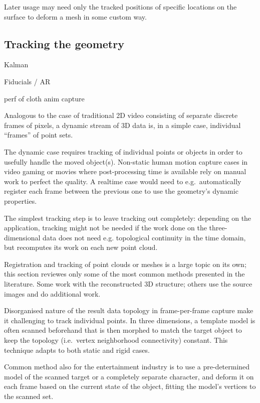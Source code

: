 Later usage may need only the tracked positions of specific locations on the surface to deform a mesh in some custom way.


\subsection{Tracking the geometry} %

Kalman

Fiducials / AR

perf of cloth anim capture

Analogous to the case of traditional 2D video consisting of separate discrete frames of pixels, a dynamic stream of 3D data is, in a simple case, individual ``frames'' of point sets.

The dynamic case requires tracking of individual points or objects in order to usefully handle the moved object(s).
Non-static human motion capture cases in video gaming or movies where post-processing time is available rely on manual work to perfect the quality.
A realtime case would need to e.g.~automatically register each frame between the previous one to use the geometry's dynamic properties.

The simplest tracking step is to leave tracking out completely: depending on the application, tracking might not be needed if the work done on the three-dimensional data does not need e.g. topological continuity in the time domain, but recomputes its work on each new point cloud.

Registration and tracking of point clouds or meshes is a large topic on its own; this section reviewes only some of the most common methods presented in the literature. Some work with the reconstructed 3D structure; others use the source images and do additional work.

Disorganised nature of the result data topology in frame-per-frame capture make it challenging to track individual points.
In three dimensions, a template model is often scanned beforehand that is then morphed to match the target object to keep the topology (i.e.~vertex neighborhood connectivity) constant.
This technique adapts to both static and rigid cases.
\cite{bojsen2012tracking,li2009robust}

Common method also for the entertainment industry is to use a pre-determined model of the scanned target or a completely separate character, and deform it on each frame based on the current state of the object, fitting the model's vertices to the scanned set.

